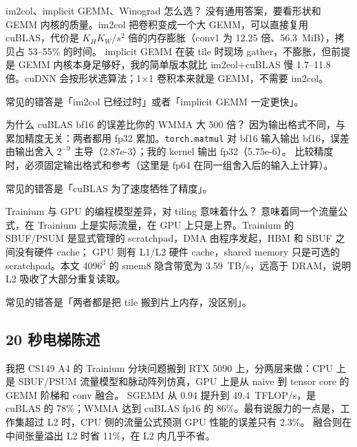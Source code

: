 \documentclass[11pt,a4paper]{ctexart}
\begin{document}
\begin{iqbox}{im2col、implicit GEMM、Winograd 怎么选？}
没有通用答案，要看形状和 GEMM 内核的质量。im2col 把卷积变成一个大 GEMM，可以直接复用 cuBLAS，代价是 $K_HK_W/s^2$ 倍的内存膨胀（conv1 为 12.25 倍、56.3~MiB），拷贝占 53--55\% 的时间。
implicit GEMM 在装 tile 时现场 gather，不膨胀，但前提是 GEMM 内核本身足够好，我的简单版本就比 im2col+cuBLAS 慢 1.7--11.8 倍。cuDNN 会按形状选算法；1$\times$1 卷积本来就是 GEMM，不需要 im2col。

常见的错答是「im2col 已经过时」或者「implicit GEMM 一定更快」。
\end{iqbox}

\begin{iqbox}{为什么 cuBLAS bf16 的误差比你的 WMMA 大 500 倍？}
因为输出格式不同，与累加精度无关：两者都用 fp32 累加。\texttt{torch.matmul} 对 bf16 输入输出 bf16，误差由输出舍入 $2^{-9}$ 主导（2.87e-3）；我的 kernel 输出 fp32（5.75e-6）。
比较精度时，必须固定输出格式和参考（这里是 fp64 在同一组舍入后的输入上计算）。

常见的错答是「cuBLAS 为了速度牺牲了精度」。
\end{iqbox}

\begin{iqbox}{Trainium 与 GPU 的编程模型差异，对 tiling 意味着什么？}
意味着同一个流量公式，在 Trainium 上是实际流量，在 GPU 上只是上界。Trainium 的 SBUF/PSUM 是显式管理的 scratchpad，DMA 由程序发起，HBM 和 SBUF 之间没有硬件 cache；
GPU 则有 L1/L2 硬件 cache，shared memory 只是可选的 scratchpad。本文 4096$^3$ 的 smem8 隐含带宽为 3.59~TB/s，远高于 DRAM，说明 L2 吸收了大部分重复读取。

常见的错答是「两者都是把 tile 搬到片上内存，没区别」。
\end{iqbox}

\subsection*{20 秒电梯陈述}
我把 CS149 A4 的 Trainium 分块问题搬到 RTX 5090 上，分两层来做：CPU 上是 SBUF/PSUM 流量模型和脉动阵列仿真，GPU 上是从 naive 到 tensor core 的 GEMM 阶梯和 conv 融合。
SGEMM 从 0.94 提升到 49.4~TFLOP/s，是 cuBLAS 的 78\%；WMMA 达到 cuBLAS fp16 的 86\%。最有说服力的一点是，工作集超过 L2 时，CPU 侧的流量公式预测 GPU 性能的误差只有 2.3\%。
融合则在中间张量溢出 L2 时省 11\%，在 L2 内几乎不省。
\end{document}

